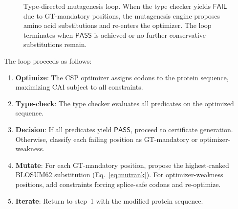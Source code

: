 \documentclass[acmsmall,review,anonymous]{acmart}
\newcommand{\PASS}{\ensuremath{\mathsf{PASS}}\xspace}
\newcommand{\FAIL}{\ensuremath{\mathsf{FAIL}}\xspace}
\begin{document}
\begin{figure}[t]
\centering
{}
\caption{Type-directed mutagenesis loop. When the type checker yields
         \FAIL{} due to GT-mandatory positions, the mutagenesis engine
         proposes amino acid substitutions and re-enters the optimizer.
         The loop terminates when \PASS{} is achieved or no further
         conservative substitutions remain.}
\label{fig:mutloop}
\end{figure}

The loop proceeds as follows:
\begin{enumerate}[leftmargin=*,itemsep=0pt,topsep=1pt]
\item \textbf{Optimize}: The CSP optimizer assigns codons to the
      protein sequence, maximizing CAI subject to all constraints.
\item \textbf{Type-check}: The type checker evaluates all predicates on
      the optimized sequence.
\item \textbf{Decision}: If all predicates yield \PASS, proceed to
      certificate generation. Otherwise, classify each failing
      position as GT-mandatory or optimizer-weakness.
\item \textbf{Mutate}: For each GT-mandatory position, propose the
      highest-ranked BLOSUM62 substitution
      (Eq.~\ref{eq:mutrank}).
      For optimizer-weakness positions, add constraints forcing
      splice-safe codons and re-optimize.
\item \textbf{Iterate}: Return to step~1 with the modified protein
      sequence.
\end{enumerate}
\end{document}
